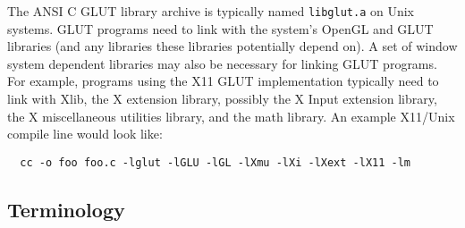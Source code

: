The ANSI C GLUT library archive is typically named {\tt libglut.a} on Unix
systems.  GLUT programs need to link with the system's OpenGL and GLUT libraries
(and any libraries these libraries potentially depend on).
A set of window system dependent libraries may also be necessary
for linking GLUT programs.  For example, programs using the X11 GLUT
implementation typically need to link with Xlib, the X extension
library, possibly the X Input extension library,  the X miscellaneous
utilities library, and the math library.  An example X11/Unix
compile line would look like:
\begin{verbatim}
  cc -o foo foo.c -lglut -lGLU -lGL -lXmu -lXi -lXext -lX11 -lm
\end{verbatim}

\subsection{Terminology}

